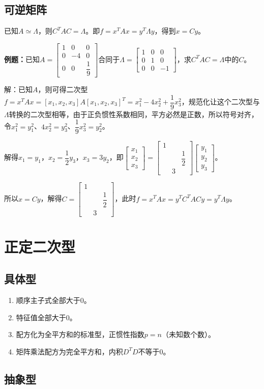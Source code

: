 \documentclass[UTF8, 12pt]{ctexart}
\begin{document}
\subsection{可逆矩阵}

已知$A\simeq\Lambda$，则$C^TAC=\Lambda$。即$f=x^TAx=y^T\Lambda y$，得到$x=Cy$。

\textbf{例题：}已知$A=\left[\begin{array}{ccc}
    1 & 0 & 0 \\
    0 & -4 & 0 \\
    0 & 0 & \dfrac{1}{9}
\end{array}\right]$合同于$\Lambda=\left[\begin{array}{ccc}
    1 & 0 & 0 \\
    0 & 1 & 0 \\
    0 & 0 & -1
\end{array}\right]$，求$C^TAC=\Lambda$中的$C$。

解：已知$A$，则可得二次型$f=x^TAx=[x_1,x_2,x_3]A[x_1,x_2,x_3]^T=x_1^2-4x_2^2+\dfrac{1}{9}x_3^2$，规范化让这个二次型与$\Lambda$转换的二次型相等，由于正负惯性系数相同，平方必然是正数，所以符号对齐，令$x_1^2=y_1^2$、$4x_2^2=y_3^2$、$\dfrac{1}{9}x_3^2=y_2^2$。

解得$x_1=y_1$，$x_2=\dfrac{1}{2}y_3$，$x_3=3y_2$，即$\left[\begin{array}{c}
    x_1 \\
    x_2 \\
    x_3
\end{array}\right]=\left[\begin{array}{ccc}
    1 \\
    & & \dfrac{1}{2} \\
    & 3
\end{array}\right]\left[\begin{array}{c}
    y_1 \\
    y_2 \\
    y_3
\end{array}\right]$。

所以$x=Cy$，解得$C=\left[\begin{array}{ccc}
    1 \\
    & & \dfrac{1}{2} \\
    & 3
\end{array}\right]$，此时$f=x^TAx=y^TC^TACy=y^T\Lambda y$。

\section{正定二次型}

\subsection{具体型}

\begin{enumerate}
    \item 顺序主子式全部大于0。
    \item 特征值全部大于0。
    \item 配方化为全平方和的标准型，正惯性指数$p=n$（未知数个数）。
    \item 矩阵乘法配方为完全平方和，内积$D^TD$不等于0。
\end{enumerate}

\subsection{抽象型}
\end{document}
